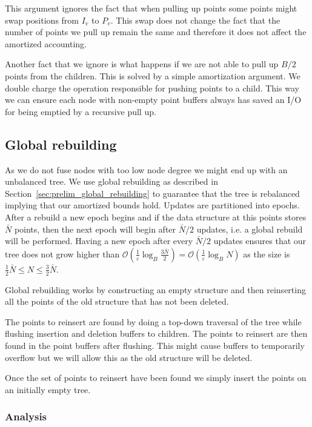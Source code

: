 \documentclass[twoside,11pt,openright]{report}
\def \epsilon {\varepsilon}
\begin{document}
This argument ignores the fact that when pulling up points some points might swap positions from $I_v$ to $P_v$. This swap does not change the fact that the number of points we pull up remain the same and therefore it does not affect the amortized accounting.

Another fact that we ignore is what happens if we are not able to pull up $B/2$ points from the children. This is solved by a simple amortization argument. We double charge the operation responsible for pushing points to a child. This way we can ensure each node with non-empty point buffers always has saved an I/O for being emptied by a recursive pull up.

\subsection{Global rebuilding}
As we do not fuse nodes with too low node degree we might end up with an unbalanced tree. We use global rebuilding as described in Section~\ref{sec:prelim_global_rebuilding} to guarantee that the tree is rebalanced implying that our amortized bounds hold.
Updates are partitioned into epochs. After a rebuild a new epoch begins and if the data structure at this points stores $\bar{N}$ points, then the next epoch will begin after $\bar{N}/2$ updates, i.e. a global rebuild will be performed.
Having a new epoch after every $\bar{N}/2$ updates ensures that our tree does not grow higher than $\mathcal{O}\left(\frac{1}{\epsilon}\log_B\frac{3\bar{N}}{2}\right) = \mathcal{O}\left(\frac{1}{\epsilon}\log_B N\right)$ as the size is $\frac{1}{2}\bar{N} \leq N \leq \frac{3}{2}\bar{N}$.

Global rebuilding works by constructing an empty structure and then reinserting all the points of the old structure that has not been deleted.

The points to reinsert are found by doing a top-down traversal of the tree while flushing insertion and deletion buffers to children. The points to reinsert are then found in the point buffers after flushing. This might cause buffers to temporarily overflow but we will allow this as the old structure will be deleted.

Once the set of points to reinsert have been found we simply insert the points on an initially empty tree.

\subsubsection*{Analysis}
\end{document}
